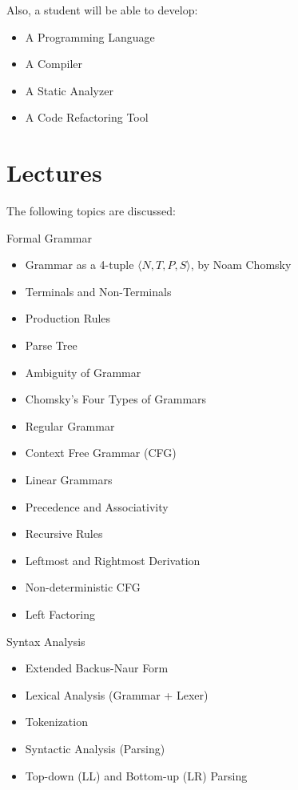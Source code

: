 \documentclass[nobrand,anonymous,nodate,nosecurity]{huawei}
\begin{document}
{Also, a student will be able to develop:

\begin{itemize}
\item A Programming Language
\item A Compiler
\item A Static Analyzer
\item A Code Refactoring Tool
\end{itemize}

\newpage
\section*{Lectures}

The following topics are discussed:

\begin{lectures}
\item Formal Grammar
	\begin{itemize}
	\item Grammar as a 4-tuple $\langle N, T, P, S \rangle$, by Noam Chomsky
	\item Terminals and Non-Terminals
	\item Production Rules
	\item Parse Tree
	\item Ambiguity of Grammar
	\item Chomsky's Four Types of Grammars
	\item Regular Grammar
	\item Context Free Grammar (CFG)
	\item Linear Grammars
	\item Precedence and Associativity
	\item Recursive Rules
	\item Leftmost and Rightmost Derivation
	\item Non-deterministic CFG
	\item Left Factoring
	\end{itemize}
\item Syntax Analysis
	\begin{itemize}
	\item Extended Backus-Naur Form
	\item Lexical Analysis (Grammar + Lexer)
	\item Tokenization
	\item Syntactic Analysis (Parsing)
	\item Top-down (LL) and Bottom-up (LR) Parsing

\end{itemize}
\end{lectures}}
\end{document}
